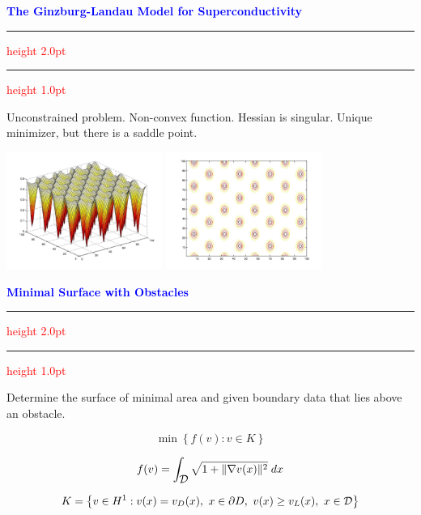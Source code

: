 \documentclass{seminar}
\newcommand{\grad}{\nabla}
\newcommand{\redstripe}{\textcolor{red}{\hrule height 2.0pt\hfil}
             \vspace{-1.8pt}
             \textcolor{red}{\hrule height 1.0pt\hfil}
}
\newcommand{\heading}[1]{%
   \centerline{\textcolor{blue}{\textbf{#1}}}%
    \redstripe%
    \bigskip
}
\newcommand{\cD} {\mbox{$\cal D$}}
\begin{document}
\begin{slide}

\heading{The Ginzburg-Landau Model for Superconductivity}

Unconstrained problem. Non-convex function. Hessian is singular.
Unique minimizer, but there is a saddle point.

\bigskip

\centerline {\includegraphics[height=1.5in]{../images/gl2_s}
             \includegraphics[height=1.5in]{../images/gl2_c}}

\end{slide}

\begin{slide}

\heading{Minimal Surface with Obstacles}

Determine the surface of minimal area and given boundary data
that lies above an obstacle.

\[
\min \left \{ f(v) : v \in K \right \}
\]

\[
f(v) = \int_{\cD} \sqrt{ 1 + \| \grad v(x) \|^2 } \; dx
\]

\[
K = \left \{ v \in H^1 : v(x) = v_D (x) , \ x \in \partial D, \ 
                v(x) \ge v_L (x) ,\  x \in \cD \right \}
\]

\vfill

\end{slide}
\end{document}
